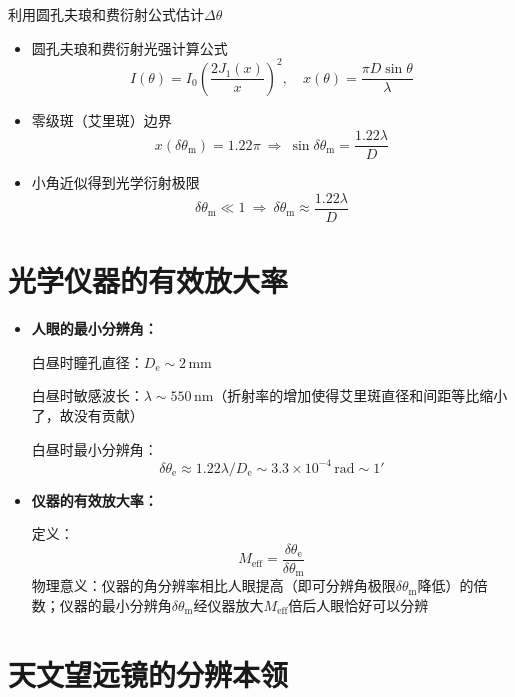\documentclass[10pt]{beamer}
\newenvironment{slide}{
    \begin{frame}{\bfseries{\sectiontitle}}
}{
    \end{frame}
}
\let\sectiononly\section
\renewcommand{\section}[1]{
    \sectiononly{#1}
    \let\sectiontitle\relax
    \newcommand{\sectiontitle}{#1}
}
\begin{document}
\begin{slide}
    利用圆孔夫琅和费衍射公式估计$\Delta\theta$
    \begin{itemize}
    \item 圆孔夫琅和费衍射光强计算公式
    \[
        I(\theta) = I_0\left(\frac{2J_1(x)}{x}\right)^2,\quad
        x(\theta) = \frac{\pi D\sin\theta}{\lambda}
    \]
    \item 零级斑（艾里斑）边界
    \[
        x(\delta\theta_{\mathrm{m}}) = 1.22\pi\ \Rightarrow\ \sin\delta\theta_{\mathrm{m}} = \frac{1.22\lambda}{D}
    \]
    \item 小角近似得到光学衍射极限
    \[
        \delta\theta_{\mathrm{m}} \ll 1\ \Rightarrow\ \boxed{\delta\theta_{\mathrm{m}} \approx \frac{1.22\lambda}{D}}
    \]
    \end{itemize}
\end{slide}

\section{光学仪器的有效放大率}

\begin{slide}
    \begin{itemize}
    \item \textbf{人眼的最小分辨角：}

        白昼时瞳孔直径：$D_{\mathrm{e}} \sim 2\,\mathrm{mm}$

        白昼时敏感波长：$\lambda \sim 550\,\mathrm{nm}$（折射率的增加使得艾里斑直径和间距等比缩小了，故没有贡献）

        白昼时最小分辨角：
        \[
            \delta\theta_{\mathrm{e}} \approx 1.22\lambda / D_{\mathrm{e}} \sim 3.3 \times 10^{-4} \,\mathrm{rad} \sim 1'
        \]
    \item \textbf{仪器的有效放大率：}

        定义：
        \[
            \boxed{M_{\mathrm{eff}} = \frac{\delta\theta_{\mathrm{e}}}{\delta\theta_{\mathrm{m}}}}
        \]
        物理意义：仪器的角分辨率相比人眼提高（即可分辨角极限$\delta\theta_{\mathrm{m}}$降低）的倍数；仪器的最小分辨角$\delta\theta_{\mathrm{m}}$经仪器放大$M_{\mathrm{eff}}$倍后人眼恰好可以分辨
    \end{itemize}
\end{slide}

\section{天文望远镜的分辨本领}
\end{document}

